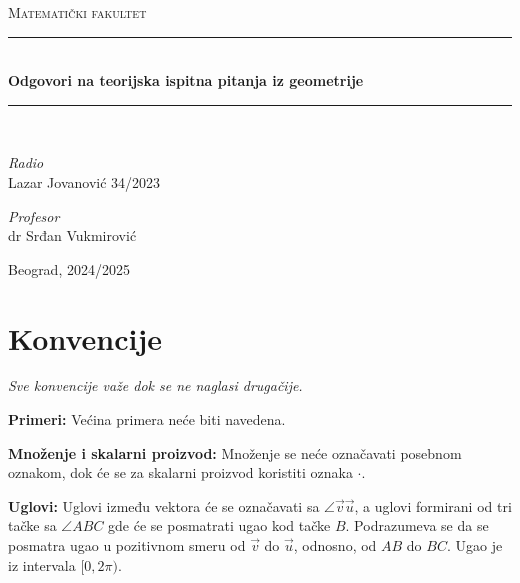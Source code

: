 \documentclass[12pt]{article}
\newcommand{\vek}[1]{\overrightarrow{#1}}
\begin{document}
\begin{titlepage}

    \newcommand{\HRule}{\rule{\linewidth}{0.4mm}}
    \center
    \textsc{\LARGE Matematički fakultet}\\[5cm]

    \HRule\\[0.4cm]
    {\LARGE\bfseries Odgovori na teorijska ispitna pitanja iz geometrije}
    \\[0.2cm]
    \HRule\\[2cm]

    \vspace{17\baselineskip}
    \begin{minipage}[t]{0.4\textwidth}
        \begin{flushleft}
            \large
            \textit{Radio}\\
            Lazar Jovanović 34/2023
        \end{flushleft}
    \end{minipage}
    \hspace*{1cm}
    \begin{minipage}[t]{0.4\textwidth}
        \begin{flushright}
            \large
            \textit{Profesor}\\
            dr Srđan Vukmirović
        \end{flushright}
    \end{minipage}

    \vfill\vfill\vfill\vfill
    {\large Beograd, 2024/2025}
    \vfill

\end{titlepage}

\tableofcontents
\newpage

\section{Konvencije}
\textit{Sve konvencije važe dok se ne naglasi drugačije.}
\par
\vspace*{1cm}

\textbf{Primeri:} Većina primera neće biti navedena.

\textbf{Množenje i skalarni proizvod:} Množenje se neće označavati posebnom
oznakom, dok će se za skalarni proizvod koristiti oznaka $\cdot$.
\par

\textbf{Uglovi:} Uglovi između vektora će se označavati sa
$\angle{\vek{v}\vek{u}}$, a uglovi formirani od tri tačke sa $\angle{ABC}$ gde
će se posmatrati ugao kod tačke $B$. Podrazumeva se da se posmatra ugao u
pozitivnom smeru od $\vek{v}$ do $\vek{u}$, odnosno, od $AB$ do $BC$. Ugao je
iz intervala $[0,2\pi)$.
\par
\end{document}
